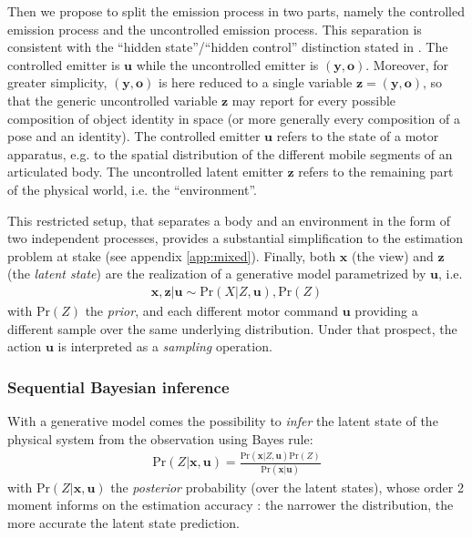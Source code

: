 \documentclass[12pt,twoside,openright]{article}
\begin{document}
Then we propose to split the emission process in two parts, namely the controlled emission process and the uncontrolled emission process. 
This separation 
is consistent with the ``hidden state''/``hidden control'' distinction stated in \citep{friston2012perceptions}.
The controlled emitter is $\boldsymbol{u}$ while the uncontrolled emitter is  $(\boldsymbol{y}, \boldsymbol{o})$. 
Moreover, for greater simplicity, $(\boldsymbol{y},\boldsymbol{o})$ is here reduced to a single variable $\boldsymbol{z} = (\boldsymbol{y}, \boldsymbol{o})$, 
so that the generic uncontrolled variable $\boldsymbol{z}$ may report for every possible composition of object identity in space (or more generally every composition of a pose and an identity).
The controlled emitter $\boldsymbol{u}$ refers to the state of a motor apparatus, e.g. to the spatial distribution of the different mobile segments of an articulated body. The uncontrolled latent emitter $\boldsymbol{z}$  refers to the remaining part of the physical world, i.e. the ``environment''. 

This restricted setup, that separates a body and an environment in the form of two independent processes,  provides a substantial simplification to the estimation problem at stake (see appendix \ref{app:mixed}).
Finally, both $\boldsymbol{x}$ (the view) and $\boldsymbol{z}$ (the \emph{latent state}) are the realization of a generative model parametrized by $\boldsymbol{u}$, i.e.
\begin{align}
\boldsymbol{x}, \boldsymbol{z} | \boldsymbol{u} \sim \text{Pr}(X|Z, \boldsymbol{u}), \text{Pr}(Z) \label{eq:generative}
\end{align}  
with $\text{Pr}(Z)$ the \emph{prior}, and each different motor command $\boldsymbol{u}$ providing a different sample over the same underlying distribution. Under that prospect, the action $\boldsymbol{u}$ is interpreted as a \emph{sampling} operation.

\subsubsection{Sequential Bayesian inference}\label{sec:seq-bayes}


With a generative model comes the possibility to \emph{infer} the latent state of the physical system from the observation
using Bayes rule:
\begin{align}
\text{Pr}(Z|\boldsymbol{x},\boldsymbol{u})
= \frac{\text{Pr}(\boldsymbol{x}|Z, \boldsymbol{u}) \text{Pr}(Z)}
{\text{Pr}(\boldsymbol{x}|\boldsymbol{u})}\label{eq:post-Pr}
\end{align}
with $\text{Pr}(Z|\boldsymbol{x},\boldsymbol{u})$ the \emph{posterior} probability
(over the latent states), whose order 2 moment informs on the estimation accuracy : the narrower the distribution, the more accurate the latent state prediction. 
\end{document}
